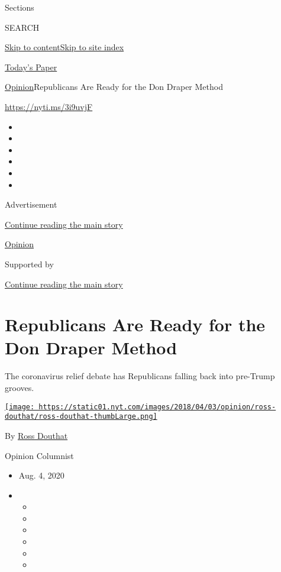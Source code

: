 Sections

SEARCH

\protect\hyperlink{site-content}{Skip to
content}\protect\hyperlink{site-index}{Skip to site index}

\href{https://myaccount.nytimes.com/auth/login?response_type=cookie\&client_id=vi}{}

\href{https://www.nytimes.com/section/todayspaper}{Today's Paper}

\href{/section/opinion}{Opinion}\textbar{}Republicans Are Ready for the
Don Draper Method

\url{https://nyti.ms/3i9uvjF}

\begin{itemize}
\item
\item
\item
\item
\item
\item
\end{itemize}

Advertisement

\protect\hyperlink{after-top}{Continue reading the main story}

\href{/section/opinion}{Opinion}

Supported by

\protect\hyperlink{after-sponsor}{Continue reading the main story}

\hypertarget{republicans-are-ready-for-the-don-draper-method}{%
\section{Republicans Are Ready for the Don Draper
Method}\label{republicans-are-ready-for-the-don-draper-method}}

The coronavirus relief debate has Republicans falling back into
pre-Trump grooves.

\href{https://www.nytimes.com/by/ross-douthat}{\texttt{[image: https://static01.nyt.com/images/2018/04/03/opinion/ross-douthat/ross-douthat-thumbLarge.png]}}

By \href{https://www.nytimes.com/by/ross-douthat}{Ross Douthat}

Opinion Columnist

\begin{itemize}
\item
  Aug. 4, 2020
\item
  \begin{itemize}
  \item
  \item
  \item
  \item
  \item
  \item
  \end{itemize}
\end{itemize}

